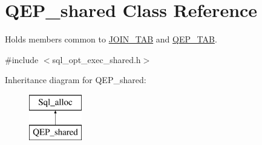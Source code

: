 \hypertarget{classQEP__shared}{}\section{Q\+E\+P\+\_\+shared Class Reference}
\label{classQEP__shared}


Holds members common to \mbox{\hyperlink{classJOIN__TAB}{J\+O\+I\+N\+\_\+\+T\+AB}} and \mbox{\hyperlink{classQEP__TAB}{Q\+E\+P\+\_\+\+T\+AB}}.  




{\ttfamily \#include $<$sql\+\_\+opt\+\_\+exec\+\_\+shared.\+h$>$}

Inheritance diagram for Q\+E\+P\+\_\+shared\+:\begin{figure}[H]
\begin{center}
\leavevmode
\includegraphics[height=2.000000cm]{classQEP__shared}
\end{center}
\end{figure}

